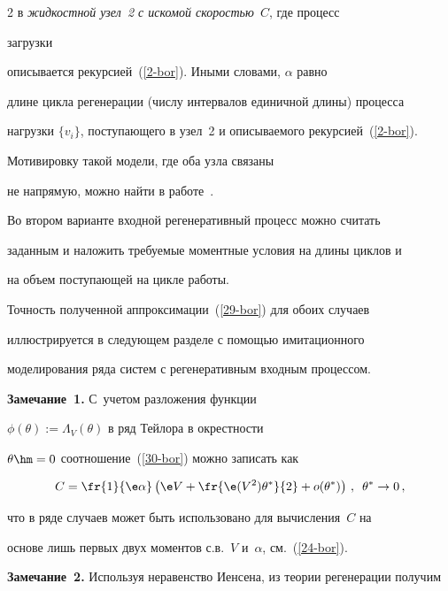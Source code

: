 \begin{multicols}{2}
 в {\it жидкостной узел~2 с искомой скоростью~$C$},  где процесс

 загрузки

описывается  рекурсией~(\ref{2-bor}). Иными словами,  $\alpha$ равно

длине цикла регенерации (числу интервалов единичной длины) процесса

нагрузки $\{v_i\}$, поступающего в узел~2 и описываемого рекурсией~(\ref{2-bor}).

 Мотивировку такой модели, где  оба узла связаны

не напрямую, можно найти в работе~\cite{KRC}.



Во втором варианте входной регенеративный  процесс можно  считать

заданным и  наложить требуемые моментные условия на длины циклов  и

на объем поступающей на цикле работы.



Точность полученной  аппроксимации~(\ref{29-bor}) для обоих случаев

иллюстрируется в следующем разделе  с помощью имитационного

моделирования  ряда систем  с регенеративным входным процессом.



\medskip



\noindent

\textbf{Замечание~1.} С~учетом разложения функции

$\phi(\theta):=\Lambda_V(\theta)$ в ряд Тейлора в окрестности

$\theta\hm=0$ соотношение~(\ref{30-bor}) можно записать как

$$

C=\fr{1}{\e \alpha}\left(\e V +\fr{\e

(V^2)\theta^*}{2}+o(\theta^*) \right)\,,\enskip \theta^*\to 0\,,

$$

что в ряде случаев может быть использовано  для вычисления~$C$  на

основе лишь первых двух моментов  с.в.~$V$ и~$\alpha$, см.~(\ref{24-bor}).



\medskip



\noindent

\textbf{Замечание~2.}  Используя  неравенство Иенсена, из теории регенерации  получим


\end{multicols}
